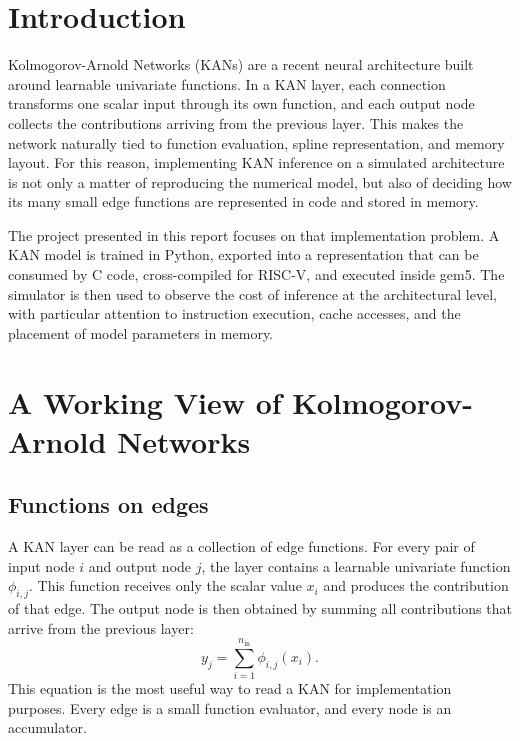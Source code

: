 \documentclass[11pt,a4paper]{article}
\begin{document}


\section{Introduction}

Kolmogorov-Arnold Networks (KANs) are a recent neural architecture built around learnable univariate functions.
In a KAN layer, each connection transforms one scalar input through its own function, and each output node collects the contributions arriving from the previous layer.
This makes the network naturally tied to function evaluation, spline representation, and memory layout.
For this reason, implementing KAN inference on a simulated architecture is not only a matter of reproducing the numerical model, but also of deciding how its many small edge functions are represented in code and stored in memory.

The project presented in this report focuses on that implementation problem.
A KAN model is trained in Python, exported into a representation that can be consumed by C code, cross-compiled for RISC-V, and executed inside gem5.
The simulator is then used to observe the cost of inference at the architectural level, with particular attention to instruction execution, cache accesses, and the placement of model parameters in memory.

\section{A Working View of Kolmogorov-Arnold Networks}
\label{sec:kan_math}

\subsection{Functions on edges}

A KAN layer can be read as a collection of edge functions.
For every pair of input node $i$ and output node $j$, the layer contains a learnable univariate function $\phi_{i,j}$.
This function receives only the scalar value $x_i$ and produces the contribution of that edge.
The output node is then obtained by summing all contributions that arrive from the previous layer:
\begin{equation}
    y_j = \sum_{i=1}^{n_{\mathrm{in}}} \phi_{i,j}(x_i).
    \label{eq:kan_layer_simple}
\end{equation}
This equation is the most useful way to read a KAN for implementation purposes.
Every edge is a small function evaluator, and every node is an accumulator.
\end{document}

